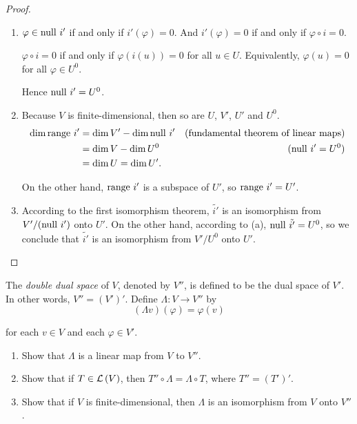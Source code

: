 \begin{proof}
    \begin{enumerate}[label={(\alph*)}]
        \item $\varphi\in \operatorname{null}\,{i'}$ if and only if $i'(\varphi) = 0$. And $i'(\varphi) = 0$ if and only if $\varphi\circ i = 0$.

              $\varphi\circ i = 0$ if and only if $\varphi(i(u)) = 0$ for all $u\in U$. Equivalently, $\varphi(u) = 0$ for all $\varphi\in U^{0}$.

              Hence $\operatorname{null}\,{i'} = U^{0}$.
        \item Because $V$ is finite-dimensional, then so are $U$, $V'$, $U'$ and $U^{0}$.
              \begin{align*}
                  \dim \operatorname{range}\,{i'} & = \dim V' - \dim\operatorname{null}\,{i'} & \text{(fundamental theorem of linear maps)} \\
                                  & = \dim V - \dim U^{0}       & \text{($\operatorname{null}\,{i'} = U^{0}$)}              \\
                                  & = \dim U = \dim U'.
              \end{align*}

              On the other hand, $\operatorname{range}\,{i'}$ is a subspace of $U'$, so $\operatorname{range}\,{i'} = U'$.
        \item According to the first isomorphism theorem, $\tilde{i'}$ is an isomorphism from $V'/(\operatorname{null}\,{i'})$ onto $U'$. On the other hand, according to (a), $\operatorname{null}\,{\tilde{i'}} = U^{0}$, so we conclude that $\tilde{i'}$ is an isomorphism from $V'/U^{0}$ onto $U'$.\qedhere
    \end{enumerate}
\end{proof}
\newpage

\begin{exercise}
    The \textit{double dual space} of $V$, denoted by $V''$, is defined to be the dual space of $V'$. In other words, $V'' = {(V')}'$. Define $\Lambda: V\to V''$ by
    \[
        (\Lambda v)(\varphi) = \varphi(v)
    \]

    for each $v\in V$ and each $\varphi\in V'$.
    \begin{enumerate}[label={(\alph*)}]
        \item Show that $\Lambda$ is a linear map from $V$ to $V''$.
        \item Show that if $T\in \mathcal{L}\left({V}\right)$, then $T''\circ \Lambda = \Lambda\circ T$, where $T'' = {(T')}'$.
        \item Show that if $V$ is finite-dimensional, then $\Lambda$ is an isomorphism from $V$ onto $V''$.
    \end{enumerate}
\end{exercise}

